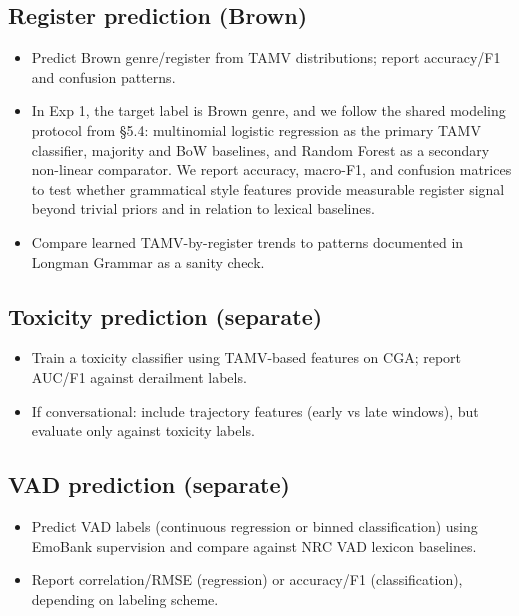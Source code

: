 \documentclass[11pt]{article}
\begin{document}
\subsection{Register prediction (Brown)}
\begin{itemize}
  \item Predict Brown genre/register from TAMV distributions; report accuracy/F1 and confusion patterns. \citep{19684/682R15.00.}
  \item In Exp 1, the target label is Brown genre, and we follow the shared modeling protocol from \S5.4: multinomial logistic regression as the primary TAMV classifier, majority and BoW baselines, and Random Forest as a secondary non-linear comparator. We report accuracy, macro-F1, and confusion matrices to test whether grammatical style features provide measurable register signal beyond trivial priors and in relation to lexical baselines.
  \item Compare learned TAMV-by-register trends to patterns documented in Longman Grammar as a sanity check. \citep{Biber20101999LongmanEnglish}
\end{itemize}

\subsection{Toxicity prediction (separate)}
\begin{itemize}
  \item Train a toxicity classifier using TAMV-based features on CGA; report AUC/F1 against derailment labels. \citep{Zhang2018ConversationsFailure}
  \item If conversational: include trajectory features (early vs late windows), but evaluate only against toxicity labels.
\end{itemize}

\subsection{VAD prediction (separate)}
\begin{itemize}
  \item Predict VAD labels (continuous regression or binned classification) using EmoBank supervision and compare against NRC VAD lexicon baselines. \citep{Buechel2017EmoBank:Analysis,Mohammad2018ObtainingWords}
  \item Report correlation/RMSE (regression) or accuracy/F1 (classification), depending on labeling scheme.
\end{itemize}
\end{document}
